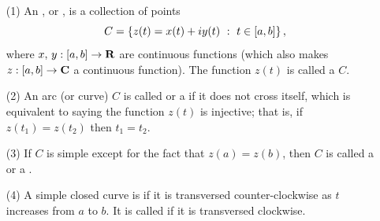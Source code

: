 \medskip

\begin{definition}[Arcs]\hfill
\begin{itemize}
\item[(1)] An , or , is a collection of points 
\[C = \left\{z(t) = x(t) + iy(t)\ :\ t \in [a,b]\right\},\]
where $x,\,y: [a,b] \to \mathbf R$ are continuous functions (which also makes $z:[a,b] \to \mathbf C$ a continuous function). The function $z(t)$ is called a  {\color{darkred}$C$}.
\item[(2)] An arc (or curve) $C$ is called  or a  if it does not cross itself, which is equivalent to saying the function $z(t)$ is injective; that is, if $z(t_1) = z(t_2)$ then $t_1 = t_2$. 
\item[(3)] If $C$ is simple except for the fact that $z(a) = z(b)$, then $C$ is called a  or a .
\item[(4)] A simple closed curve is  if it is transversed counter-clockwise as $t$ increases from $a$ to $b$. It is called  if it is transversed clockwise.
\end{itemize}
\end{definition}

\medskip

